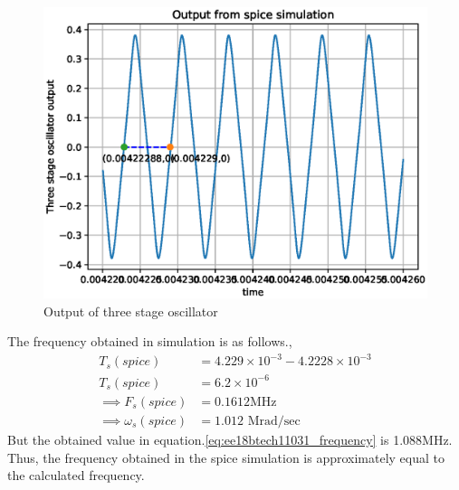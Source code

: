 \begin{enumerate}[label=\arabic*.,ref=\theenumi]
\begin{figure}[!ht]
\centering
\includegraphics[width=\columnwidth]{./figs/ee18btech11031/ee18btech11031_spice_2.eps}
\caption{Output of three stage oscillator}
\label{fig:ee18btech11031_ee18btech11031_spice2}
\end{figure}
The frequency obtained in simulation is as follows.,
 \begin{align}
     T_s(spice) &= 4.229\times10^{-3} - 4.2228\times10^{-3}\\
     T_s(spice) &= 6.2\times10^{-6}\\
     \implies F_s(spice) &= 0.1612 \text{MHz}\\
     \implies \omega_s(spice) &= 1.012 \text{ Mrad/sec}
 \end{align}
But the obtained value in equation.\ref{eq:ee18btech11031_frequency} is 1.088MHz.
Thus, the frequency obtained in the spice simulation is approximately equal to the calculated frequency.
\end{enumerate}

